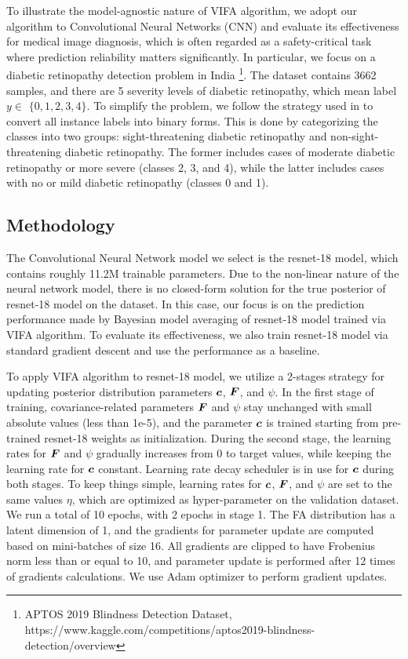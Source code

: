 \documentclass[10pt]{article} %
\begin{document}
To illustrate the model-agnostic nature of VIFA algorithm, we adopt our algorithm to Convolutional Neural Networks (CNN) and evaluate its effectiveness for medical image diagnosis, which is often regarded as a safety-critical task where prediction reliability matters significantly. In particular, we focus on a diabetic retinopathy detection problem in India \footnote{APTOS 2019 Blindness Detection Dataset, https://www.kaggle.com/competitions/aptos2019-blindness-detection/overview}. The dataset contains 3662 samples, and there are 5 severity levels of diabetic retinopathy, which mean label $y \in$ $\{0,1,2,3,4\}$. To simplify the problem, we follow the strategy used in \cite{leibig2017leveraging} to convert all instance labels into binary forms. This is done by categorizing the classes into two groups: sight-threatening diabetic retinopathy and non-sight-threatening diabetic retinopathy. The former includes cases of moderate diabetic retinopathy or more severe (classes 2, 3, and 4), while the latter includes cases with no or mild diabetic retinopathy (classes 0 and 1).

\subsection{Methodology}

The Convolutional Neural Network model we select is the resnet-18 model, which contains roughly 11.2M trainable parameters. Due to the non-linear nature of the neural network model, there is no closed-form solution for the true posterior of resnet-18 model on the dataset. In this case, our focus is on the prediction performance made by Bayesian model averaging of resnet-18 model trained via VIFA algorithm. To evaluate its effectiveness, we also train resnet-18 model via standard gradient descent and use the performance as a baseline. 

To apply VIFA algorithm to resnet-18 model, we utilize a 2-stages strategy for updating posterior distribution parameters ${\bm{c}}$, ${\bm{F}}$, and $\psi$. In the first stage of training, covariance-related parameters ${\bm{F}}$ and $\psi$ stay unchanged with small absolute values (less than 1e-5), and the parameter ${\bm{c}}$ is trained starting from pre-trained resnet-18 weights as initialization. During the second stage, the learning rates for ${\bm{F}}$ and $\psi$ gradually increases from 0 to target values, while keeping the learning rate for ${\bm{c}}$ constant. Learning rate decay scheduler is in use for ${\bm{c}}$ during both stages. To keep things simple, learning rates for ${\bm{c}}$, ${\bm{F}}$, and $\psi$ are set to the same values $\eta$, which are optimized as hyper-parameter on the validation dataset. We run a total of 10 epochs, with 2 epochs in stage 1. The FA distribution has a latent dimension of 1, and the gradients for parameter update are computed based on mini-batches of size 16. All gradients are clipped to have Frobenius norm less than or equal to 10, and parameter update is performed after 12 times of gradients calculations. We use Adam optimizer \cite{kingma2014adam} to perform gradient updates.
\end{document}

